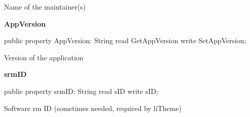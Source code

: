\documentclass{report}
\newif\ifpdf
\begin{document}
\begin{list}{}
\begin{flushleft}
\ifpdf
\end{flushleft}
\fi


\par Name of the maintainer(s)\label{utilities.TListEntry-AppVersion}
\item[\textbf{AppVersion}\hfill]
\ifpdf
\begin{flushleft}
\fi
\begin{ttfamily}
public property AppVersion: String read GetAppVersion write SetAppVersion;\end{ttfamily}

\ifpdf
\end{flushleft}
\fi


\par Version of the application\label{utilities.TListEntry-srmID}
\item[\textbf{srmID}\hfill]
\ifpdf
\begin{flushleft}
\fi
\begin{ttfamily}
public property srmID: String read sID write sID;\end{ttfamily}

\ifpdf
\end{flushleft}
\fi


\par Software rm ID (sometimes needed, required by liTheme)\end{list}
\end{document}
